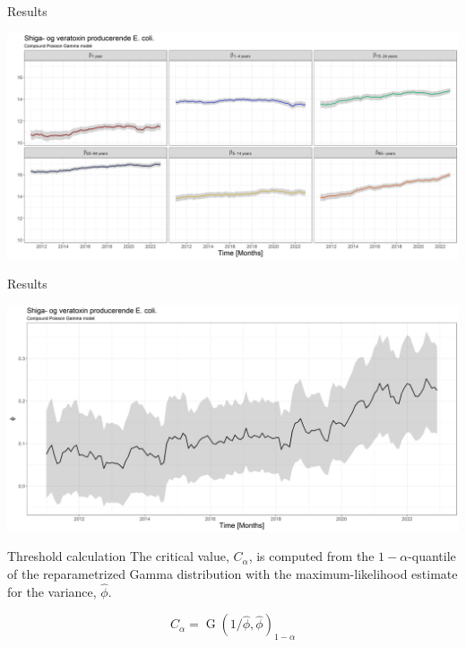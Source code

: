 \documentclass[aspectratio=169]{beamer}
\DeclareMathOperator{\G}{G}
\begin{document}
\begin{frame}{Results}
\protect\hypertarget{results-2}{}
\tiny

\includegraphics[width=1\linewidth]{../figures/thetaSTECPoisGExclude}

\normalsize
\end{frame}

\begin{frame}{Results}
\protect\hypertarget{results-3}{}
\tiny

\includegraphics[width=1\linewidth]{../figures/phiSTECPoisGExclude}

\normalsize
\end{frame}

\begin{frame}{Threshold calculation}
\protect\hypertarget{threshold-calculation-1}{}
The critical value, \(C_\alpha\), is computed from the
\(1-\alpha\)-quantile of the reparametrized Gamma distribution with the
maximum-likelihood estimate for the variance, \(\hat\phi\).

\begin{equation}
  C_\alpha=\G(1/\hat\phi,\hat\phi)_{1-\alpha}
\end{equation}
\end{frame}
\end{document}

